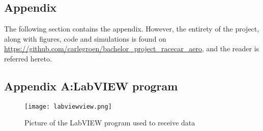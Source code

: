 \begin{appendices}
\chapter{Appendix}

The following section contains the appendix. However, the entirety of the project, along with figures, code and simulations is found on \url{https://github.com/carlegroen/bachelor_project_racecar_aero}, and the reader is referred hereto.

\newpage
\section*{Appendix A:LabVIEW program}
\begin{figure}[hb]
  \texttt{[image: labviewview.png]}
  \caption{Picture of the LabVIEW program used to receive data}
  \label{app:labviewview}
\end{figure}

\end{appendices}
